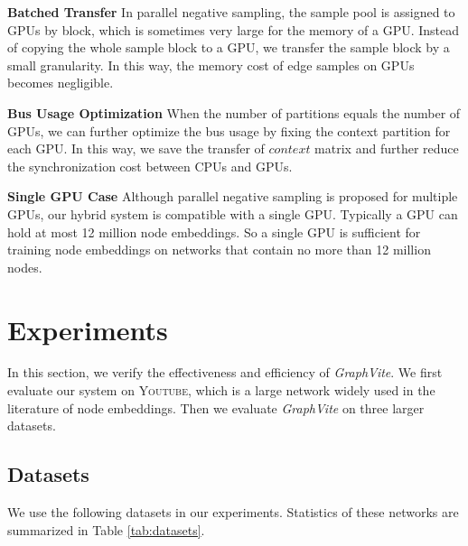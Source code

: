 \documentclass[sigconf]{acmart}
\newcommand{\dataset}[1]{\textsc{#1}\xspace}
\newcommand{\Graphy}{\textit{GraphVite}\xspace}
\begin{document}
\smallskip \noindent \textbf{Batched Transfer} In parallel negative sampling, the sample pool is assigned to GPUs by block, which is sometimes very large for the memory of a GPU. Instead of copying the whole sample block to a GPU, we transfer the sample block by a small granularity. In this way, the memory cost of edge samples on GPUs becomes negligible.

\smallskip \noindent \textbf{Bus Usage Optimization} When the number of partitions equals the number of GPUs, we can further optimize the bus usage by fixing the context partition for each GPU. In this way, we save the transfer of $context$ matrix and further reduce the synchronization cost between CPUs and GPUs.

\smallskip \noindent \textbf{Single GPU Case} Although parallel negative sampling is proposed for multiple GPUs, our hybrid system is compatible with a single GPU. Typically a GPU can hold at most 12 million node embeddings. So a single GPU is sufficient for training node embeddings on networks that contain no more than 12 million nodes. \section{Experiments}
\label{sec:experiment}

In this section, we verify the effectiveness and efficiency of \Graphy. We first evaluate our system on \dataset{Youtube}, which is a large network widely used in the literature of node embeddings. Then we evaluate \Graphy on three larger datasets.

\subsection{Datasets}

We use the following datasets in our experiments. Statistics of these networks are summarized in Table \ref{tab:datasets}.
\end{document}
